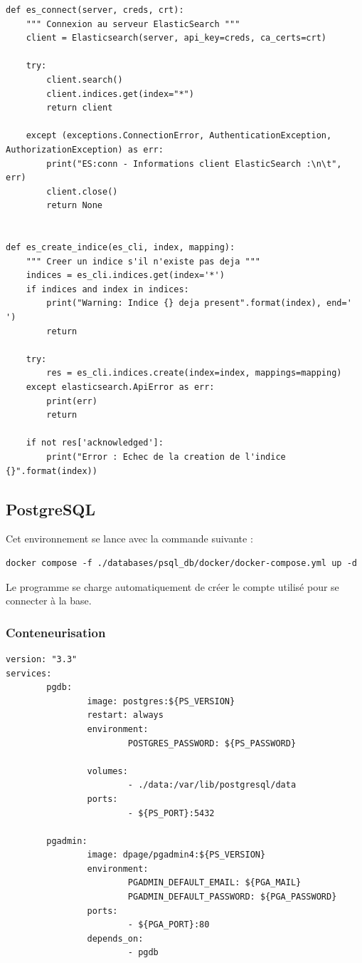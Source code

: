 \documentclass[a4paper,12pt]{article}
\begin{document}
			
				\begin{lstlisting}[title=Fonctions Python utiles]
def es_connect(server, creds, crt):
    """ Connexion au serveur ElasticSearch """
    client = Elasticsearch(server, api_key=creds, ca_certs=crt)

    try:
        client.search()
        client.indices.get(index="*")
        return client

    except (exceptions.ConnectionError, AuthenticationException, AuthorizationException) as err:
        print("ES:conn - Informations client ElasticSearch :\n\t", err)
        client.close()
        return None


def es_create_indice(es_cli, index, mapping):
    """ Creer un indice s'il n'existe pas deja """
    indices = es_cli.indices.get(index='*')
    if indices and index in indices:
        print("Warning: Indice {} deja present".format(index), end=' ')
        return

    try:
        res = es_cli.indices.create(index=index, mappings=mapping)
    except elasticsearch.ApiError as err:
        print(err)
        return

    if not res['acknowledged']:
        print("Error : Echec de la creation de l'indice {}".format(index))
				\end{lstlisting}
				


	\subsection{PostgreSQL} \label{PSQL}
		Cet environnement se lance avec la commande suivante :
		\begin{verbatim}
docker compose -f ./databases/psql_db/docker/docker-compose.yml up -d		
		\end{verbatim}
		
		Le programme se charge automatiquement de créer le compte utilisé pour se connecter à la base.
				
		\subsubsection{Conteneurisation}
			\begin{lstlisting}[title=DockerCompose]
version: "3.3"
services:
        pgdb:
                image: postgres:${PS_VERSION}
                restart: always
                environment:
                        POSTGRES_PASSWORD: ${PS_PASSWORD}

                volumes:
                        - ./data:/var/lib/postgresql/data
                ports:
                        - ${PS_PORT}:5432

        pgadmin:
                image: dpage/pgadmin4:${PS_VERSION}
                environment:
                        PGADMIN_DEFAULT_EMAIL: ${PGA_MAIL}
                        PGADMIN_DEFAULT_PASSWORD: ${PGA_PASSWORD}
                ports:
                        - ${PGA_PORT}:80
                depends_on:
                        - pgdb
			\end{lstlisting}
			
\end{document}
